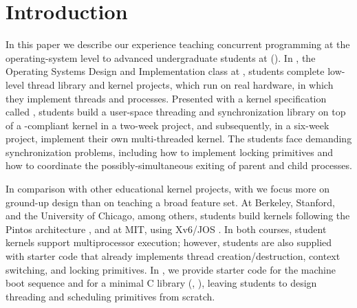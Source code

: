 \section{Introduction}
\label{sec:intro}


In this paper we describe our experience teaching concurrent programming at the operating-system level to advanced undergraduate students at \carnegiemellon (\cmu).
In \fourten, the Operating Systems Design and Implementation class at \cmu,
students complete low-level thread library and kernel projects,
which run on real hardware,
in which they implement threads and processes.
Presented with a kernel specification called \pebbles
\cite{kspec-anonymized}, students build a user-space threading and synchronization library on top of a \pebbles-compliant kernel in a two-week project, and subsequently, in a six-week project, implement their own multi-threaded kernel.
The students face demanding synchronization problems, including how to implement locking primitives and how to coordinate the possibly-simultaneous exiting of parent and child processes.

In comparison with other educational kernel projects,
with \pebbles we focus more on ground-up design than on teaching a broad feature set.
At Berkeley, Stanford, and the University of Chicago, among others, students build kernels following the Pintos architecture \cite{pintos}, and at MIT, using Xv6/JOS \cite{xv6}.
In both courses, student kernels support multiprocessor execution;
however, students are also supplied with starter code that already implements thread creation/destruction, context switching, and locking primitives.
In \fourten, we provide starter code for the machine boot sequence and for a minimal C library (, ), leaving students to design threading and scheduling primitives from scratch.

